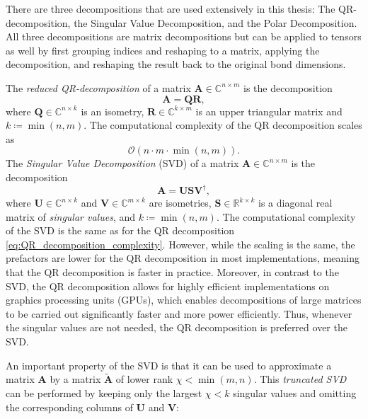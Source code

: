 There are three decompositions that are used extensively in this thesis: The QR-decomposition, the Singular Value Decomposition, and the Polar Decomposition. All three decompositions are matrix decompositions but can be applied to tensors as well by first grouping indices and reshaping to a matrix, applying the decomposition, and reshaping the result back to the original bond dimensions. \par
The \textit{reduced QR-decomposition} of a matrix $\bm{A} \in \mathbb{C}^{n\times m}$ is the decomposition
\begin{equation}
	\label{eq:QR_decomposition_general}
	\bm{A} = \bm{Q}\bm{R},
\end{equation}
where $\bm{Q}\in\mathbb{C}^{n\times k}$ is an isometry, $\bm{R}\in\mathbb{C}^{k\times m}$ is an upper triangular matrix and $k \coloneqq \min(n, m)$. The computational complexity of the QR decomposition scales as
\begin{equation}
	\label{eq:QR_decomposition_complexity}
	\mathcal{O}\left(n\cdot m\cdot\min(n, m)\right).
\end{equation}
The \textit{Singular Value Decomposition} (SVD) of a matrix $\bm{A} \in \mathbb{C}^{n\times m}$ is the decomposition
\begin{equation}
	\label{eq:SVD_general}
	\bm{A} = \bm{U}\bm{S}\bm{V}^\dagger,
\end{equation}
where $\bm{U}\in\mathbb{C}^{n\times k}$ and $\bm{V}\in\mathbb{C}^{m\times k}$ are isometries, $\bm{S}\in\mathbb{R}^{k\times k}$ is a diagonal real matrix of \textit{singular values}, and $k \coloneqq \min(n, m)$. The computational complexity of the SVD is the same as for the QR decomposition \eqref{eq:QR_decomposition_complexity}. However, while the scaling is the same, the prefactors are lower for the QR decomposition in most implementations, meaning that the QR decomposition is faster in practice. Moreover, in contrast to the SVD, the QR decomposition allows for highly efficient implementations on graphics processing units (GPUs), which enables decompositions of large matrices to be carried out significantly faster and more power efficiently. Thus, whenever the singular values are not needed, the QR decomposition is preferred over the SVD. \par
An important property of the SVD is that it can be used to approximate a matrix $\bm{A}$ by a matrix $\tilde{\bm{A}}$ of lower rank $\chi < \min(m, n)$. This \textit{truncated SVD} can be performed by keeping only the largest $\chi < k$ singular values and omitting the corresponding columns of $\bm{U}$ and $\bm{V}$:
